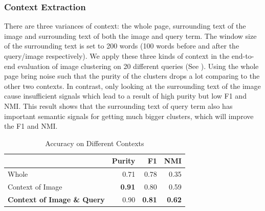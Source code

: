 \subsubsection{Context Extraction}
\label{sec:contexteval}
There are three variances of context: the whole page, surrounding
text of the image and surrounding text of both the image and query term.
The window size of the surrounding text is set to 200 words (100 words
before and after the query/image respectively).
We apply these three kinds of context in the end-to-end evaluation of
image clustering on 20 different queries (See ).
Using the whole page bring noise such that the purity of the clusters
drops a lot comparing to the other two contexts. In contrast, only looking at the
surrounding text of the image cause insufficient signals which lead to
a result of high purity but low F1 and NMI.
This result shows that the surrounding text of query term
also has important semantic signals for getting much bigger clusters,
which will improve the F1 and NMI.

\begin{table}[th]
\centering
\small
\caption{Accuracy on Different Contexts}
\begin{tabular}{|l|r|r|r|}
\hline
     &        Purity &          F1 &         NMI \\
\hline
     Whole &       0.71 &       0.78 &       0.35 \\
\hline
Context of Image  &       {\bf 0.91} &       0.80 &        0.59  \\
\hline
{\bf Context of Image \& Query} &       0.90 &       {\bf 0.81} &     {\bf 0.62} \\
\hline
\end{tabular}
\label{tab:contexteval}
\end{table}

